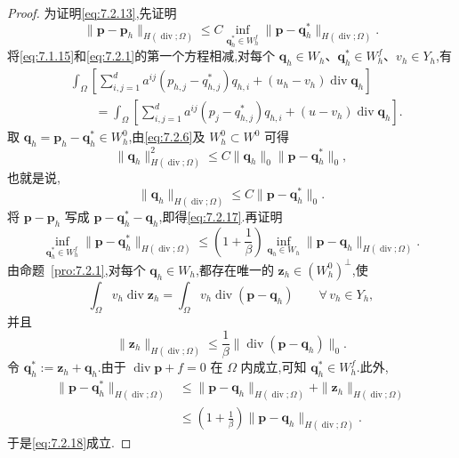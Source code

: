 \begin{proof}
为证明\eqref{eq:7.2.13},先证明
\begin{equation}\label{eq:7.2.17}
  \|\boldsymbol{p}-\boldsymbol{p}_h\|_{H(\operatorname{div};\Omega)}
   \le C\inf_{\boldsymbol{q}_h^*\in W_h^f}
         \|\boldsymbol{p}-\boldsymbol{q}_h^*\|_{H(\operatorname{div};\Omega)}.
\end{equation}
将\eqref{eq:7.1.15}和\eqref{eq:7.2.1}的第一个方程相减,对每个 \(\boldsymbol{q}_h\in W_h\)、\(\boldsymbol{q}_h^*\in W_h^f\)、\(v_h\in Y_h\),有
\[
  \begin{aligned}
   &\int_\Omega\left[\sum_{i,j=1}^d a^{ij}(p_{h,j}-q_{h,j}^*)q_{h,i}
            +(u_h-v_h)\operatorname{div}\boldsymbol{q}_h\right]\\
   &\qquad=\int_\Omega\left[\sum_{i,j=1}^d a^{ij}(p_j-q_{h,j}^*)q_{h,i}
            +(u-v_h)\operatorname{div}\boldsymbol{q}_h\right].
  \end{aligned}
\]
取 \(\boldsymbol{q}_h=\boldsymbol{p}_h-\boldsymbol{q}_h^*\in W_h^0\),由\eqref{eq:7.2.6}及 \(W_h^0\subset W^0\) 可得
\[
  \|\boldsymbol{q}_h\|_{H(\operatorname{div};\Omega)}^2
    \le C\|\boldsymbol{q}_h\|_0\|\boldsymbol{p}-\boldsymbol{q}_h^*\|_0,
\]
也就是说,
\[
  \|\boldsymbol{q}_h\|_{H(\operatorname{div};\Omega)}
    \le C\|\boldsymbol{p}-\boldsymbol{q}_h^*\|_0.
\]
将 \(\boldsymbol{p}-\boldsymbol{p}_h\) 写成 \(\boldsymbol{p}-\boldsymbol{q}_h^*-\boldsymbol{q}_h\),即得\eqref{eq:7.2.17}.再证明
\begin{equation}\label{eq:7.2.18}
  \inf_{\boldsymbol{q}_h^*\in W_h^f}\|\boldsymbol{p}-\boldsymbol{q}_h^*\|_{H(\operatorname{div};\Omega)}
     \le\left(1+\frac1\beta\right)
       \inf_{\boldsymbol{q}_h\in W_h}\|\boldsymbol{p}-\boldsymbol{q}_h\|_{H(\operatorname{div};\Omega)}.
\end{equation}
由命题~\ref{pro:7.2.1},对每个 \(\boldsymbol{q}_h\in W_h\),都存在唯一的 \(\boldsymbol{z}_h\in(W_h^0)^\perp\),使
\[
  \int_\Omega v_h\operatorname{div}\boldsymbol{z}_h
    =\int_\Omega v_h\operatorname{div}(\boldsymbol{p}-\boldsymbol{q}_h)\qquad\forall\,v_h\in Y_h,
\]
并且
\[
  \|\boldsymbol{z}_h\|_{H(\operatorname{div};\Omega)}
     \le\frac1\beta\|\operatorname{div}(\boldsymbol{p}-\boldsymbol{q}_h)\|_0.
\]
令 \(\boldsymbol{q}_h^*:=\boldsymbol{z}_h+\boldsymbol{q}_h\).由于 \(\operatorname{div}\boldsymbol{p}+f=0\) 在 \(\Omega\) 内成立,可知 \(\boldsymbol{q}_h^*\in W_h^f\).此外,
\[
  \begin{aligned}
    \|\boldsymbol{p}-\boldsymbol{q}_h^*\|_{H(\operatorname{div};\Omega)}
    &\le\|\boldsymbol{p}-\boldsymbol{q}_h\|_{H(\operatorname{div};\Omega)}
       +\|\boldsymbol{z}_h\|_{H(\operatorname{div};\Omega)}\\
    &\le\left(1+\frac1\beta\right)\|\boldsymbol{p}-\boldsymbol{q}_h\|_{H(\operatorname{div};\Omega)}.
  \end{aligned}
\]
于是\eqref{eq:7.2.18}成立.


\end{proof}
